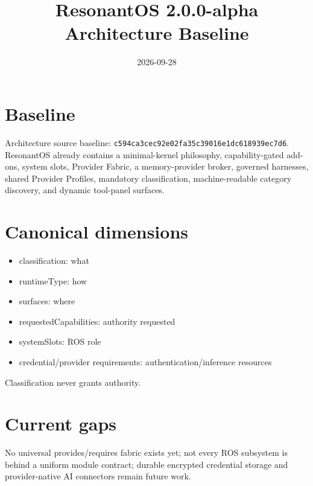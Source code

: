 \documentclass[11pt]{article}
\title{ResonantOS 2.0.0-alpha Architecture Baseline}\date{2026-09-28}
\begin{document}
\maketitle
\section{Baseline}
Architecture source baseline: \texttt{c594ca3cec92e02fa35c39016e1dc618939ec7d6}. ResonantOS already contains a minimal-kernel philosophy, capability-gated add-ons, system slots, Provider Fabric, a memory-provider broker, governed harnesses, shared Provider Profiles, mandatory classification, machine-readable category discovery, and dynamic tool-panel surfaces.
\section{Canonical dimensions}
\begin{itemize}\item classification: what\item runtimeType: how\item surfaces: where\item requestedCapabilities: authority requested\item systemSlots: ROS role\item credential/provider requirements: authentication/inference resources\end{itemize}
Classification never grants authority.
\section{Current gaps}
No universal provides/requires fabric exists yet; not every ROS subsystem is behind a uniform module contract; durable encrypted credential storage and provider-native AI connectors remain future work.
\end{document}
